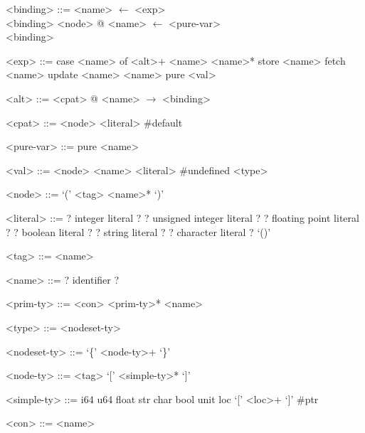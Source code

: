 \documentclass[main.tex]{subfiles}
\begin{document}
	\hspace{-0.7cm}
	\begin{minipage}{0.5\textwidth}
		\setlength{\grammarindent}{2.5cm} %
		\begin{grammar}
			
			<binding> ::= <name> $\leftarrow$ <exp> \\ <binding>
			\alt <node> @ <name> $\leftarrow$ <pure-var> \\ <binding>
			\alt <pure-var>
			
			<exp> ::= case <name> of <alt>+   
			\alt <name> <name>*
			\alt store <name>
			\alt fetch <name>
			\alt update <name> <name>
			\alt pure <val>
			
			<alt> ::= <cpat> @ <name> $\rightarrow$ <binding>
			
			<cpat> ::= <node>
			\alt \#default
			
			<pure-var> ::= pure <name>
			
			<val> ::= <node> 
			\alt <name>
			\alt \#undefined <type>
			
			<node> ::= `(' <tag> <name>* `)'
			
			<literal> ::= ? integer literal ?
			\alt ? unsigned integer literal ?
			\alt ? floating point literal ?
			\alt ? boolean literal ?
			\alt ? string literal ?
			\alt ? character literal ?
			\alt `()'
			
			<tag> ::= <name>
			
			<name> ::= ? identifier ?
			
		\end{grammar}
	\end{minipage}
	\hfill
	\begin{minipage}{0.45\textwidth}
			\vspace{-1.75cm}
		\setlength{\grammarindent}{2.75cm} %
		\begin{grammar}
			<prim-ty> ::= <con> <prim-ty>*
			\alt <name>
			\alt <simple-ty>
			
			<type> ::= <nodeset-ty>
			\alt <simple-ty>
			
			<nodeset-ty> ::= `\{' <node-ty>+ `\}'
			
			<node-ty> ::= <tag> {`['} <simple-ty>* {`]'}
	
			<simple-ty> ::= i64
			\alt u64
			\alt float
			\alt str
			\alt char
			\alt bool
			\alt unit
			\alt loc `[' <loc>+ `]'
			\alt \#ptr
			
			<con> ::= <name>
		\end{grammar}
	\end{minipage}
	
\end{document}
